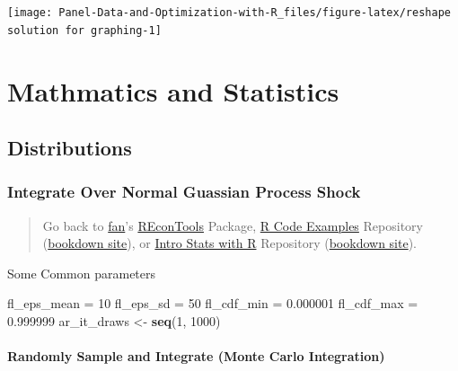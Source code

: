 \documentclass[
]{book}
\newenvironment{Shaded}{\begin{snugshade}}{\end{snugshade}}
\newcommand{\DecValTok}[1]{\textcolor[rgb]{0.00,0.00,0.81}{#1}}
\newcommand{\FloatTok}[1]{\textcolor[rgb]{0.00,0.00,0.81}{#1}}
\newcommand{\KeywordTok}[1]{\textcolor[rgb]{0.13,0.29,0.53}{\textbf{#1}}}
\newcommand{\NormalTok}[1]{#1}
\newcommand{\StringTok}[1]{\textcolor[rgb]{0.31,0.60,0.02}{#1}}
\begin{document}
\begin{center}\texttt{[image: Panel-Data-and-Optimization-with-R\_files/figure-latex/reshape solution for graphing-1]} \end{center}

\hypertarget{mathmatics-and-statistics}{%
\chapter{Mathmatics and Statistics}\label{mathmatics-and-statistics}}

\hypertarget{distributions}{%
\section{Distributions}\label{distributions}}

\hypertarget{integrate-over-normal-guassian-process-shock}{%
\subsection{Integrate Over Normal Guassian Process Shock}\label{integrate-over-normal-guassian-process-shock}}

\begin{quote}
Go back to \href{http://fanwangecon.github.io/}{fan}'s \href{https://fanwangecon.github.io/REconTools/}{REconTools} Package, \href{https://fanwangecon.github.io/R4Econ/}{R Code Examples} Repository (\href{https://fanwangecon.github.io/R4Econ/bookdown}{bookdown site}), or \href{https://fanwangecon.github.io/Stat4Econ/}{Intro Stats with R} Repository (\href{https://fanwangecon.github.io/Stat4Econ/bookdown}{bookdown site}).
\end{quote}

Some Common parameters

\begin{Shaded}
\begin{Highlighting}[]
\NormalTok{fl_eps_mean =}\StringTok{ }\DecValTok{10}
\NormalTok{fl_eps_sd =}\StringTok{ }\DecValTok{50}
\NormalTok{fl_cdf_min =}\StringTok{ }\FloatTok{0.000001}
\NormalTok{fl_cdf_max =}\StringTok{ }\FloatTok{0.999999}
\NormalTok{ar_it_draws <-}\StringTok{ }\KeywordTok{seq}\NormalTok{(}\DecValTok{1}\NormalTok{, }\DecValTok{1000}\NormalTok{)}
\end{Highlighting}
\end{Shaded}

\hypertarget{randomly-sample-and-integrate-monte-carlo-integration}{%
\subsubsection{Randomly Sample and Integrate (Monte Carlo Integration)}\label{randomly-sample-and-integrate-monte-carlo-integration}}
\end{document}
